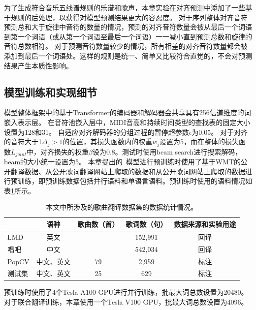 为了生成符合音乐五线谱规则的乐谱和歌声，本章实验在对齐预测中添加了一些基于规则的后处理，以获得对模型预测结果更大的容忍度。
对于序列整体对齐音符预测总和大于旋律中音符的数量的情况，预测的对齐音符数量会被从最后一个词语到第一个词语（或从第一个词语至最后一个词语）一一减小直到预测总数和旋律的音符总数相符。
对于预测音符数量较少的情况，所有相差的对齐音符数量都会被添加到最后一个词语处。这样的规则是统一、简单又比较符合直觉的，不会对预测结果产生本质性影响。
\subsection{模型训练和实现细节}
模型整体框架中的基于Transformer的编码器和解码器会共享具有256信道维度的词嵌入表示层。
在音符池嵌入层中，MIDI音高和持续时间类型的查找表的固定大小设置为128和31。
自适应对齐解码器的分组过程的暂停超参数$\epsilon$为0.05。
对于对齐的音符大于1$\Delta_j>1$的位置，其损失函数内的权重$w_j$设置为5，而在整体的损失函数$L_{joint}$中，对齐损失的权重$\beta$设为0.8。测试时使用beam search进行搜索解码，beam的大小统一设置为5。
本章提出的\modelname~模型进行预训练时使用了基于WMT的公开翻译数据、从公开歌词翻译网站上爬取的数据和从公开歌词网站上爬取的数据进行预训练，即预训练数据包括并行语料和单语言语料。预训练时使用的语料情况如表\ref{tab:pretrain_data}所示。
\begin{table}[htbp]
    \centering
    \caption{本文中所涉及的歌曲翻译数据集的数据统计情况。}
    \begin{tabular}{|l|c|c|c|c|}
    \hline
         & 语种 & 歌曲数（首） & 歌词数（句） & 数据来源和实验用途\\
    \hline
     LMD & 英文 & \diagbox[]{}{} & 152,991 & 回译\\
    \hline
     唱吧 & 中文 & \diagbox[]{}{} & 542,034 & 回译\\
    \hline
     PopCV & 中文、英文 & 79 & 2,959 & 标注\\
    \hline
     测试集 & 中文、英文 & 25 & 629 & 标注\\
    \hline
    \end{tabular}
    \label{tab:pretrain_data}
\end{table}
预训练时使用了4个Tesla A100 GPU进行并行训练，批最大词总数设置为20480。
对于联合翻译训练，本章使用一个Tesla V100 GPU，批最大词总数设置为4096。


